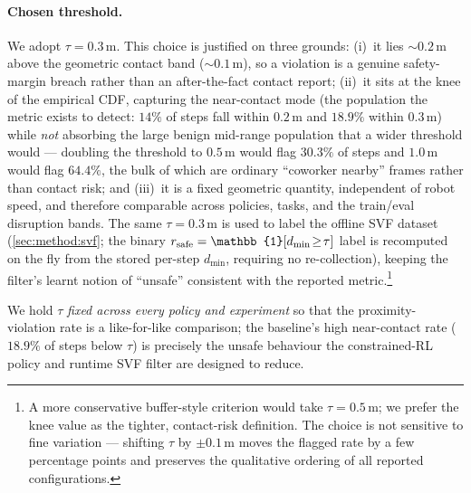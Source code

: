 \paragraph{Chosen threshold.}
We adopt $\tau = \mathbf{0.3}\,$m. This choice is justified on three grounds:
(i)~it lies $\sim\!0.2$\,m above the geometric contact band ($\sim\!0.1$\,m), so a violation
is a genuine safety-margin breach rather than an after-the-fact contact report;
(ii)~it sits at the knee of the empirical CDF, capturing the near-contact mode (the
population the metric exists to detect: $14\%$ of steps fall within $0.2$\,m and $18.9\%$
within $0.3$\,m) while \emph{not} absorbing the large benign mid-range population that a
wider threshold would --- doubling the threshold to $0.5$\,m would flag $30.3\%$ of steps and
$1.0$\,m would flag $64.4\%$, the bulk of which are ordinary ``coworker nearby'' frames rather
than contact risk; and (iii)~it is a fixed geometric quantity, independent of robot speed,
and therefore comparable across policies, tasks, and the train/eval disruption bands. The
same $\tau=0.3$\,m is used to label the offline SVF dataset (\cref{sec:method:svf}; the binary
$r_{\rm safe}=\mathbb{1}[d_{\min}\!\ge\!\tau]$ label is recomputed on the fly from the stored
per-step $d_{\min}$, requiring no re-collection), keeping the filter's learnt notion of
``unsafe'' consistent with the reported metric.\footnote{A more conservative buffer-style
criterion would take $\tau=0.5$\,m; we prefer the knee value as the tighter, contact-risk
definition. The choice is not sensitive to fine variation --- shifting $\tau$ by $\pm0.1$\,m
moves the flagged rate by a few percentage points and preserves the qualitative ordering of
all reported configurations.}

We hold $\tau$ \emph{fixed across every policy and experiment} so that the proximity-violation
rate is a like-for-like comparison; the baseline's high near-contact rate ($18.9\%$ of steps
below $\tau$) is precisely the unsafe behaviour the constrained-RL policy and runtime SVF
filter are designed to reduce.
